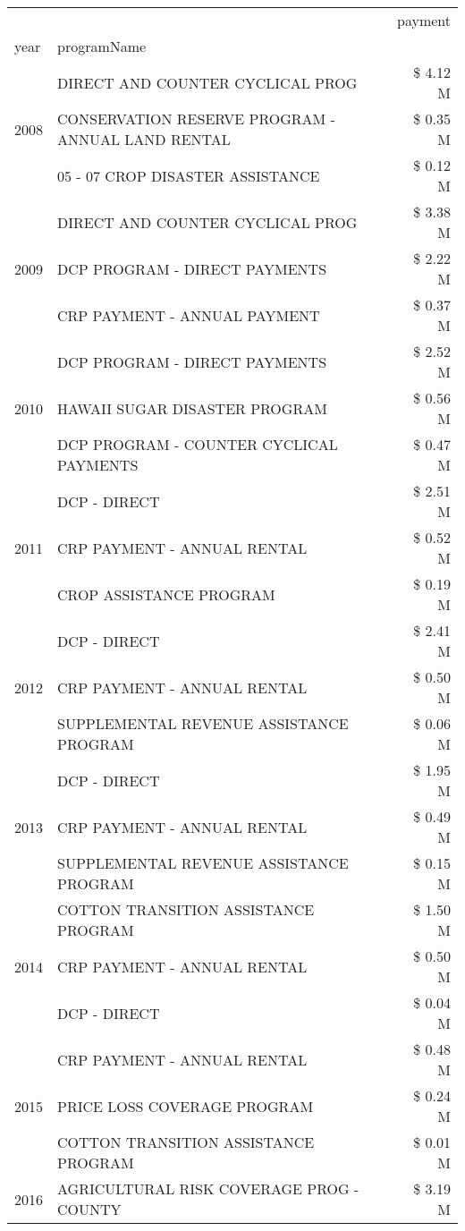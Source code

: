 \begin{tabular}{llr}
\toprule
 &  & payment \\
year & programName &  \\
\midrule
\multirow[t]{3}{*}{2008} & DIRECT AND COUNTER CYCLICAL PROG & \$ 4.12 M \\
 & CONSERVATION RESERVE PROGRAM - ANNUAL LAND RENTAL & \$ 0.35 M \\
 & 05 - 07 CROP DISASTER ASSISTANCE & \$ 0.12 M \\
\cline{1-3}
\multirow[t]{3}{*}{2009} & DIRECT AND COUNTER CYCLICAL PROG & \$ 3.38 M \\
 & DCP PROGRAM - DIRECT PAYMENTS & \$ 2.22 M \\
 & CRP PAYMENT - ANNUAL PAYMENT & \$ 0.37 M \\
\cline{1-3}
\multirow[t]{3}{*}{2010} & DCP PROGRAM - DIRECT PAYMENTS & \$ 2.52 M \\
 & HAWAII SUGAR DISASTER PROGRAM & \$ 0.56 M \\
 & DCP PROGRAM - COUNTER CYCLICAL PAYMENTS & \$ 0.47 M \\
\cline{1-3}
\multirow[t]{3}{*}{2011} & DCP - DIRECT & \$ 2.51 M \\
 & CRP PAYMENT - ANNUAL RENTAL & \$ 0.52 M \\
 & CROP ASSISTANCE PROGRAM & \$ 0.19 M \\
\cline{1-3}
\multirow[t]{3}{*}{2012} & DCP - DIRECT & \$ 2.41 M \\
 & CRP PAYMENT - ANNUAL RENTAL & \$ 0.50 M \\
 & SUPPLEMENTAL REVENUE ASSISTANCE PROGRAM & \$ 0.06 M \\
\cline{1-3}
\multirow[t]{3}{*}{2013} & DCP - DIRECT & \$ 1.95 M \\
 & CRP PAYMENT - ANNUAL RENTAL & \$ 0.49 M \\
 & SUPPLEMENTAL REVENUE ASSISTANCE PROGRAM & \$ 0.15 M \\
\cline{1-3}
\multirow[t]{3}{*}{2014} & COTTON TRANSITION ASSISTANCE PROGRAM & \$ 1.50 M \\
 & CRP PAYMENT - ANNUAL RENTAL & \$ 0.50 M \\
 & DCP - DIRECT & \$ 0.04 M \\
\cline{1-3}
\multirow[t]{3}{*}{2015} & CRP PAYMENT - ANNUAL RENTAL & \$ 0.48 M \\
 & PRICE LOSS COVERAGE PROGRAM & \$ 0.24 M \\
 & COTTON TRANSITION ASSISTANCE PROGRAM & \$ 0.01 M \\
\cline{1-3}
\multirow[t]{3}{*}{2016} & AGRICULTURAL RISK COVERAGE PROG - COUNTY & \$ 3.19 M \\

\end{tabular}
